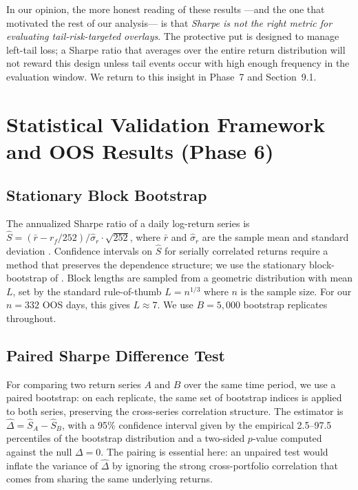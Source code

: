 \documentclass[11pt,letterpaper]{article}
\begin{document}
In our opinion, the more honest reading of these results —and the one that motivated the rest of our analysis— is that \emph{Sharpe is not the right metric for evaluating tail-risk-targeted overlays}. The protective put is designed to manage left-tail loss; a Sharpe ratio that averages over the entire return distribution will not reward this design unless tail events occur with high enough frequency in the evaluation window. We return to this insight in Phase~7 and Section~9.1.

\section{Statistical Validation Framework and OOS Results (Phase 6)}

\subsection{Stationary Block Bootstrap}

The annualized Sharpe ratio of a daily log-return series is $\widehat{S} = (\bar r - r_f / 252) / \widehat\sigma_r \cdot \sqrt{252}$, where $\bar r$ and $\widehat\sigma_r$ are the sample mean and standard deviation \citep{sharpe1966mutual}. Confidence intervals on $\widehat S$ for serially correlated returns require a method that preserves the dependence structure; we use the stationary block-bootstrap of \citet{politis1994stationary}. Block lengths are sampled from a geometric distribution with mean $L$, set by the standard rule-of-thumb $L = n^{1/3}$ where $n$ is the sample size. For our $n = 332$ OOS days, this gives $L \approx 7$. We use $B = 5{,}000$ bootstrap replicates throughout.

\subsection{Paired Sharpe Difference Test}

For comparing two return series $A$ and $B$ over the same time period, we use a paired bootstrap: on each replicate, the same set of bootstrap indices is applied to both series, preserving the cross-series correlation structure. The estimator is $\widehat\Delta = \widehat S_A - \widehat S_B$, with a 95\% confidence interval given by the empirical 2.5–97.5 percentiles of the bootstrap distribution and a two-sided $p$-value computed against the null $\Delta = 0$. The pairing is essential here: an unpaired test would inflate the variance of $\widehat\Delta$ by ignoring the strong cross-portfolio correlation that comes from sharing the same underlying returns.
\end{document}
